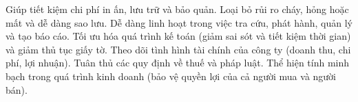 
  

Giúp tiết kiệm chi phí in ấn, lưu trữ và bảo quản.
Loại bỏ rủi ro cháy, hỏng hoặc mất và dễ dàng sao lưu.
Dễ dàng linh hoạt trong việc tra cứu, phát hành, quản lý và tạo báo cáo.
Tối ưu hóa quá trình kế toán (giảm sai sót và tiết kiệm thời gian) và giảm thủ tục giấy tờ.
Theo dõi tình hình tài chính của công ty (doanh thu, chi phí, lợi nhuận).
Tuân thủ các quy định về thuế và pháp luật.
Thể hiện tính minh bạch trong quá trình kinh doanh (bảo vệ quyền lợi của cả người mua và người bán).